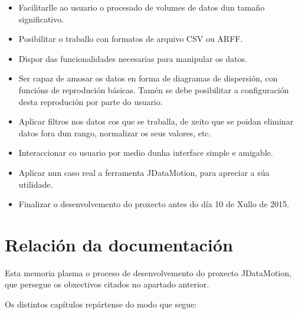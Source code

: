 \begin{itemize}
\item Facilitarlle ao usuario o procesado de volumes de datos dun tamaño significativo. 
\item Posibilitar o traballo con formatos de arquivo CSV ou ARFF. 
\item Dispor das funcionalidades necesarias para manipular os datos. 
\item Ser capaz de amosar os datos en forma de diagramas de dispersión, con funcións de reprodución básicas. Tamén se debe posibilitar a configuración desta reprodución por parte do usuario. 
\item Aplicar filtros nos datos cos que se traballa, de xeito que se poidan eliminar datos fora dun rango, normalizar os seus valores, etc.
\item Interaccionar co usuario por medio dunha interface simple e amigable.
\item Aplicar nun caso real a ferramenta JDataMotion, para apreciar a súa utilidade.
\item Finalizar o desenvolvemento do proxecto antes do día 10 de Xullo de 2015.
\end{itemize} 

\section{Relación da documentación}

Esta memoria plasma o proceso de desenvolvemento do proxecto JDataMotion, que persegue os obxectivos citados no apartado anterior.

Os distintos capítulos repártense do modo que segue:

